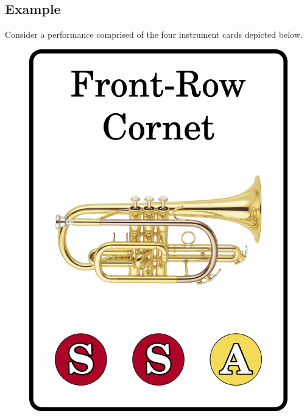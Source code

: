 \documentclass[a6paper, 12pt, parskip=half, DIV=14]{scrartcl}
\begin{document}
\subsection*{Example}
Consider a performance comprised of the four instrument cards depicted below.
\begin{figure}[h]
\centering
\includegraphics[scale=0.035]{Images/CardImages/cornet_display_front.png}
\ 

\end{figure}
\end{document}
